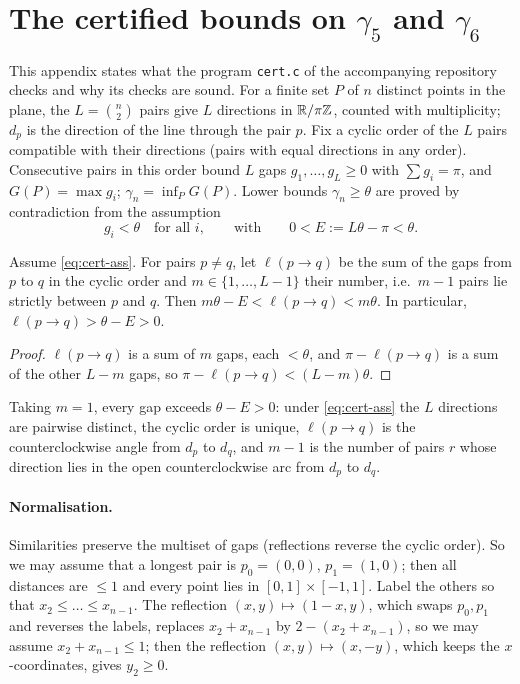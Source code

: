 \section{The certified bounds on \texorpdfstring{$\gamma_5$ and $\gamma_6$}{gamma\_5 and gamma\_6}}\label{app:cert}

This appendix states what the program \texttt{cert.c} of the accompanying repository checks and why its
checks are sound. For a finite set $P$ of $n$ distinct points in the plane, the $L=\binom n2$ pairs give $L$
directions in $\mathbb{R}/\pi\mathbb{Z}$, counted with multiplicity; $d_p$ is the direction of the line through the pair $p$. Fix a cyclic order of the $L$ pairs compatible with their
directions (pairs with equal directions in any order). Consecutive pairs in this order bound $L$ gaps
$g_1,\dots,g_L\ge0$ with $\sum g_i=\pi$, and $G(P)=\max g_i$; $\gamma_n=\inf_P G(P)$. Lower bounds
$\gamma_n\ge\theta$ are proved by contradiction from the assumption
\begin{equation}\label{eq:cert-ass}
  g_i<\theta\quad\text{for all }i,\qquad\text{with}\qquad 0<E:=L\theta-\pi<\theta .
\end{equation}

\begin{lemma}\label{lem:cert-H}
Assume \eqref{eq:cert-ass}. For pairs $p\ne q$, let $\ell(p\to q)$ be the sum of the gaps from $p$ to $q$ in the
cyclic order and $m\in\{1,\dots,L-1\}$ their number, i.e.\ $m-1$ pairs lie strictly between $p$ and $q$. Then
$m\theta-E<\ell(p\to q)<m\theta$. In particular, $\ell(p\to q)>\theta-E>0$.
\end{lemma}

\begin{proof}
$\ell(p\to q)$ is a sum of $m$ gaps, each $<\theta$, and $\pi-\ell(p\to q)$ is a sum of the other $L-m$ gaps,
so $\pi-\ell(p\to q)<(L-m)\theta$.
\end{proof}

Taking $m=1$, every gap exceeds $\theta-E>0$: under \eqref{eq:cert-ass} the $L$ directions are pairwise distinct,
the cyclic order is unique, $\ell(p\to q)$ is the counterclockwise angle from $d_p$ to $d_q$, and $m-1$ is the number
of pairs $r$ whose direction lies in the open counterclockwise arc from $d_p$ to $d_q$.

\paragraph{Normalisation.} Similarities preserve the multiset of gaps (reflections reverse the cyclic
order). So we may assume that a longest pair is $p_0=(0,0)$, $p_1=(1,0)$; then all distances are $\le1$ and
every point lies in $[0,1]\times[-1,1]$. Label the others so that $x_2\le\dots\le x_{n-1}$. The reflection
$(x,y)\mapsto(1-x,y)$, which swaps $p_0,p_1$ and reverses the labels, replaces $x_2+x_{n-1}$ by
$2-(x_2+x_{n-1})$, so we may assume $x_2+x_{n-1}\le1$; then the reflection $(x,y)\mapsto(x,-y)$, which keeps the
$x$-coordinates, gives $y_2\ge0$.


